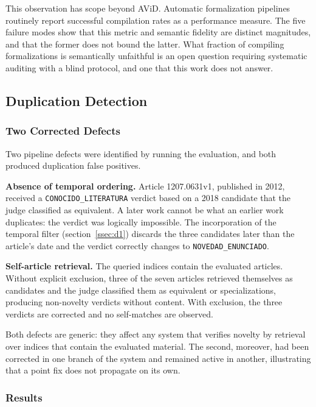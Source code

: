 \documentclass[12pt,a4paper]{article}
\theoremstyle{remark}
\begin{document}
This observation has scope beyond AViD. Automatic formalization pipelines routinely report successful compilation rates as a performance measure. The five failure modes show that this metric and semantic fidelity are distinct magnitudes, and that the former does not bound the latter. What fraction of compiling formalizations is semantically unfaithful is an open question requiring systematic auditing with a blind protocol, and one that this work does not answer.

\subsection{Duplication Detection}

\subsubsection{Two Corrected Defects}

Two pipeline defects were identified by running the evaluation, and both produced duplication false positives.

\textbf{Absence of temporal ordering.} Article 1207.0631v1, published in 2012, received a \texttt{CONOCIDO\_LITERATURA} verdict based on a 2018 candidate that the judge classified as equivalent. A later work cannot be what an earlier work duplicates: the verdict was logically impossible. The incorporation of the temporal filter (section~\ref{ssec:d1}) discards the three candidates later than the article's date and the verdict correctly changes to \texttt{NOVEDAD\_ENUNCIADO}.

\textbf{Self-article retrieval.} The queried indices contain the evaluated articles. Without explicit exclusion, three of the seven articles retrieved themselves as candidates and the judge classified them as equivalent or specializations, producing non-novelty verdicts without content. With exclusion, the three verdicts are corrected and no self-matches are observed.

Both defects are generic: they affect any system that verifies novelty by retrieval over indices that contain the evaluated material. The second, moreover, had been corrected in one branch of the system and remained active in another, illustrating that a point fix does not propagate on its own.

\subsubsection{Results}
\end{document}
